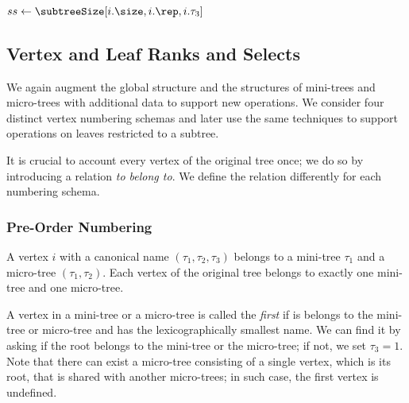 \begin{algorithm}
\begin{algorithmic}
		\State $ss \gets \subtreeSize[i.\size, i.\rep, i.\tau_3]$
			\State {}
		\Else
			\State {}
		\EndIf
			\State {}
		\Else
			\State {}
		\EndIf
	\Else
		\State {}
	\EndIf
\EndFunction
\end{algorithmic}
\end{algorithm}

\subsection{Vertex and Leaf Ranks and Selects}

We again augment the global structure and the structures of mini-trees and micro-trees with additional data to support new operations.
We consider four distinct vertex numbering schemas and later use the same techniques to support operations on leaves restricted to a subtree.

It is crucial to account every vertex of the original tree once; we do so by introducing a relation \emph{to belong to}.
We define the relation differently for each numbering schema.

\subsubsection{Pre-Order Numbering}

A vertex $i$ with a canonical name $(\tau_1, \tau_2, \tau_3)$ belongs to a mini-tree $\tau_1$ and a micro-tree $(\tau_1, \tau_2)$.
Each vertex of the original tree belongs to exactly one mini-tree and one micro-tree.

A vertex in a mini-tree or a micro-tree is called the \emph{first} if is belongs to the mini-tree or micro-tree and has the lexicographically smallest name.
We can find it by asking if the root belongs to the mini-tree or the micro-tree; if not, we set $\tau_3 = 1$.
Note that there can exist a micro-tree consisting of a single vertex, which is its root, that is shared with another micro-trees; in such case, the first vertex is undefined.

\bigbreak

